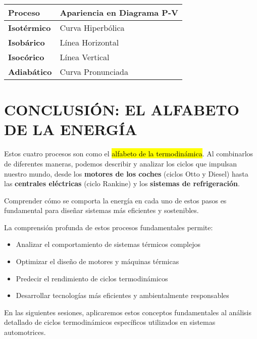 \documentclass{article}
\begin{document}
\begin{center}
\begin{tabular}{|p{2.5cm}|p{4cm}|}
\hline
\textbf{Proceso} & \textbf{Apariencia en Diagrama P-V} \\
\hline\hline
\textbf{Isotérmico} & Curva Hiperbólica \\
\hline
\textbf{Isobárico} & Línea Horizontal \\
\hline
\textbf{Isocórico} & Línea Vertical \\
\hline
\textbf{Adiabático} & Curva Pronunciada \\
\hline
\end{tabular}
\end{center}

\vspace{5mm}

\section*{CONCLUSIÓN: EL ALFABETO DE LA ENERGÍA}

Estos cuatro procesos son como el \hl{alfabeto de la termodinámica}. Al combinarlos de diferentes maneras, podemos describir y analizar los ciclos que impulsan nuestro mundo, desde los \textbf{motores de los coches} (ciclos Otto y Diesel) hasta las \textbf{centrales eléctricas} (ciclo Rankine) y los \textbf{sistemas de refrigeración}. 

Comprender cómo se comporta la energía en cada uno de estos pasos es fundamental para diseñar sistemas más eficientes y sostenibles.

La comprensión profunda de estos procesos fundamentales permite:

\begin{itemize}
    \item Analizar el comportamiento de sistemas térmicos complejos
    \item Optimizar el diseño de motores y máquinas térmicas
    \item Predecir el rendimiento de ciclos termodinámicos
    \item Desarrollar tecnologías más eficientes y ambientalmente responsables
\end{itemize}

En las siguientes sesiones, aplicaremos estos conceptos fundamentales al análisis detallado de ciclos termodinámicos específicos utilizados en sistemas automotrices.
\end{document}
